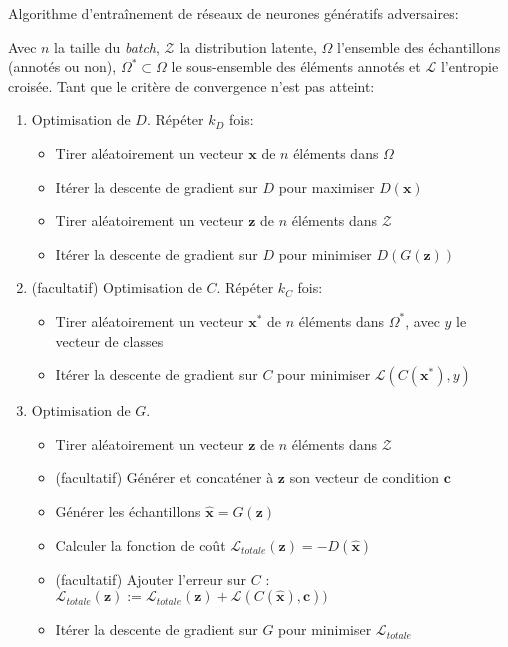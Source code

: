 \begin{definition}
	\label{def:gan}
	Algorithme d'entraînement de réseaux de neurones génératifs adversaires:

	Avec $n$ la taille du \emph{batch}, $\mathcal{Z}$ la distribution latente, $\Omega$ l'ensemble des échantillons (annotés ou non), $\Omega^* \subset \Omega$ le sous-ensemble des éléments annotés et $\mathcal{L}$ l'entropie croisée.
	Tant que le critère de convergence n'est pas atteint:
	\begin{enumerate}
		\item Optimisation de $D$. Répéter $k_D$ fois:
		\begin{itemize}
			\item Tirer aléatoirement un vecteur $\mathbf{x}$ de $n$ éléments dans $\Omega$
			\item Itérer la descente de gradient sur $D$ pour maximiser $D(\mathbf{x})$
			\item Tirer aléatoirement un vecteur $\mathbf{z}$ de $n$ éléments dans $\mathcal{Z}$
			\item Itérer la descente de gradient sur $D$ pour minimiser $D(G(\mathbf{z}))$
		\end{itemize}
		\item (facultatif) Optimisation de $C$. Répéter $k_C$ fois:
		\begin{itemize}
			\item Tirer aléatoirement un vecteur $\mathbf{x}^*$ de $n$ éléments dans $\Omega^*$, avec $y$ le vecteur de classes
			\item Itérer la descente de gradient sur $C$ pour minimiser $\mathcal{L}(C(\mathbf{x}^*),y)$
		\end{itemize}
		\item Optimisation de $G$.
		\begin{itemize}
			\item Tirer aléatoirement un vecteur $\mathbf{z}$ de $n$ éléments dans $\mathcal{Z}$
			\item (facultatif) Générer et concaténer à $\mathbf{z}$ son vecteur de condition $\mathbf{c}$
			\item Générer les échantillons $\hat{\mathbf{x}} = G(\mathbf{z})$
			\item Calculer la fonction de coût $\mathcal{L}_\mathit{totale}(\mathbf{z}) = -D(\hat{\mathbf{x}})$
			\item (facultatif) Ajouter l'erreur sur $C$ : $\mathcal{L}_\mathit{totale}(\mathbf{z}) := \mathcal{L}_\mathit{totale}(\mathbf{z}) + \mathcal{L}(C(\mathbf{\hat{x}}),\mathbf{c}))$
			\item Itérer la descente de gradient sur $G$ pour minimiser $\mathcal{L}_\mathit{totale}$
		\end{itemize}
	\end{enumerate}
\end{definition}


